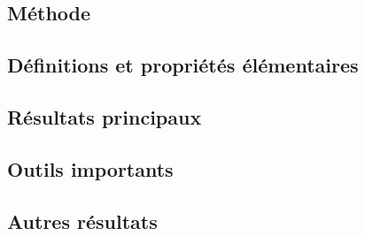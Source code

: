 \documentclass[11pt,a4paper]{article}
\begin{document}
\subsection*{Méthode}

\subsection*{Définitions et propriétés élémentaires}

\subsection*{Résultats principaux}

\subsection*{Outils importants}


\subsection*{Autres résultats}
\end{document}
